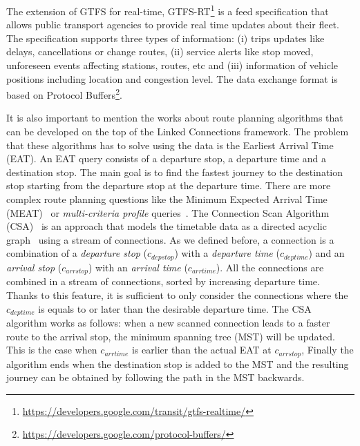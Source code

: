 \documentclass[sw]{iosart2x}
\begin{document}
	The extension of GTFS for real-time, GTFS-RT\footnote{\url{https://developers.google.com/transit/gtfs-realtime/}} is a feed specification that allows public transport agencies to provide real time updates about their fleet. The specification supports three types of information: (i) trips updates like delays, cancellations or change routes, (ii) service alerts like stop moved, unforeseen events affecting stations, routes, etc and (iii) information of vehicle positions including location and congestion level. The data exchange format is based on Protocol Buffers\footnote{\url{https://developers.google.com/protocol-buffers/}}.
	
	It is also important to mention the works about route planning algorithms that can be developed on the top of the Linked Connections framework. The problem that these algorithms has to solve using the data is the Earliest Arrival Time (EAT). An EAT query consists of a departure stop, a departure time and a destination stop. The main goal is to find the fastest journey to the destination stop starting from the departure stop at the departure time. There are more complex route planning questions like the Minimum Expected Arrival Time (MEAT)~\cite{dibbelt2013intriguingly} or \textit{multi-criteria profile} queries~\cite{bast2010fast,delling2014round,witt2015trip}. The Connection Scan Algorithm (CSA)~\cite{dibbelt2013intriguingly} is an approach that models the timetable data as a directed acyclic graph~\cite{strasser2014connection} using a stream of connections. As we defined before, a connection is a combination of a \textit{departure stop} ($c_{depstop}$) with a \textit{departure time} ($c_{deptime}$) and an \textit{arrival stop} ($c_{arrstop}$) with an \textit{arrival time} ($c_{arrtime}$). All the connections are combined in a stream of connections, sorted by increasing departure time. Thanks to this feature, it is sufficient to only consider the connections where the $c_{deptime}$ is equals to or later than the desirable departure time. The CSA algorithm works as follows: when a new scanned connection leads to a faster route to the arrival stop, the minimum spanning tree (MST) will be updated. This is the case when $c_{arrtime}$ is earlier than the actual EAT at $c_{arrstop}$, Finally the algorithm ends when the destination stop is added to the MST and the resulting journey can be obtained by following the path in the MST backwards.
	
\end{document}

